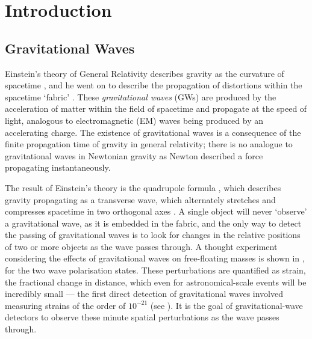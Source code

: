 
\chapter{Introduction}
\label{chap:intro}


\chaptoc{}


\section{Gravitational Waves}
\label{sec:gw}


\begin{colsection}

Einstein's theory of General Relativity describes gravity as the curvature of spacetime \citep{Einstein1914}, and he went on to describe the propagation of distortions within the spacetime `fabric' \citep{Einstein1916}. These \emph{gravitational waves} (GWs)  are produced by the acceleration of matter within the field of spacetime and propagate at the speed of light, analogous to electromagnetic (EM)  waves being produced by an accelerating charge. The existence of gravitational waves is a consequence of the finite propagation time of gravity in general relativity; there is no analogue to gravitational waves in Newtonian gravity as Newton described a force propagating instantaneously.

The result of Einstein's theory is the quadrupole formula \citep{Einstein1916}, which describes gravity propagating as a transverse wave, which alternately stretches and compresses spacetime in two orthogonal axes \citep{BIGcardiff}. A single object will never `observe' a gravitational wave, as it is embedded in the fabric, and the only way to detect the passing of gravitational waves is to look for changes in the relative positions of two or more objects as the wave passes through. A thought experiment considering the effects of gravitational waves on free-floating masses is shown in , for the two wave polarisation states. These perturbations are quantified as strain, the fractional change in distance, which even for astronomical-scale events will be incredibly small --- the first direct detection of gravitational waves involved measuring strains of the order of $10^{-21}$ (see ). It is the goal of gravitational-wave detectors to observe these minute spatial perturbations as the wave passes through.


\end{colsection}
